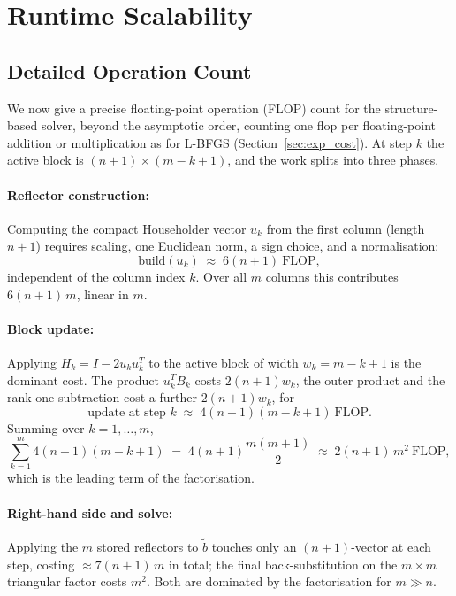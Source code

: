 \section{Runtime Scalability}
\label{sec:qr_scalability}
\subsection{Detailed Operation Count}
\label{sec:qr_flop_count}

\noindent We now give a precise floating-point operation (FLOP) count for the
structure-based solver, beyond the asymptotic order, counting one flop per
floating-point addition or multiplication as for L-BFGS
(Section~\ref{sec:exp_cost}). At step $k$ the active
block is $(n+1)\times(m-k+1)$, and the work splits into three phases.

\paragraph{Reflector construction:} Computing the compact Householder vector
$u_k$ from the first column (length $n+1$) requires scaling, one Euclidean
norm, a sign choice, and a normalisation:
\[
  \text{build}(u_k) \;\approx\; 6(n+1) \ \text{FLOP},
\]
independent of the column index $k$. Over all $m$ columns this contributes
$6(n+1)\,m$, linear in $m$.

\paragraph{Block update:} Applying $H_k = I - 2u_ku_k^T$ to the active block
of width $w_k = m-k+1$ is the dominant cost. The product $u_k^T B_k$ costs
$2(n+1)w_k$, the outer product and the rank-one subtraction cost a further
$2(n+1)w_k$, for
\[
  \text{update at step } k \;\approx\; 4(n+1)(m-k+1) \ \text{FLOP}.
\]
Summing over $k=1,\dots,m$,
\[
  \sum_{k=1}^{m} 4(n+1)(m-k+1)
  \;=\; 4(n+1)\frac{m(m+1)}{2}
  \;\approx\; 2(n+1)\,m^2 \ \text{FLOP},
\]
which is the leading term of the factorisation.

\paragraph{Right-hand side and solve:} Applying the $m$ stored reflectors to
$\tilde b$ touches only an $(n+1)$-vector at each step, costing
$\approx 7(n+1)\,m$ in total; the final back-substitution on the $m\times m$
triangular factor costs $m^2$. Both are dominated by the factorisation for
$m \gg n$.

